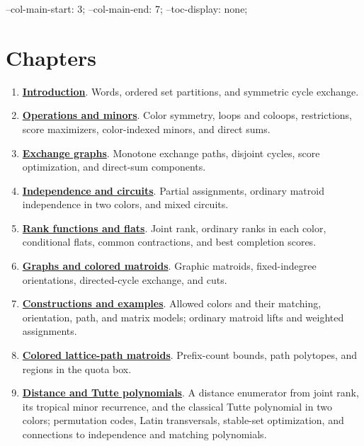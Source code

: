 
\begin{cssvars}
  --col-main-start: 3;
  --col-main-end: 7;
  --toc-display: none;
\end{cssvars}

\section[chapters]{Chapters}

\begin{enumerate}
\item \href{intro.htm}{\textbf{Introduction}}. Words, ordered set partitions,
and symmetric cycle exchange.

\item \href{operations.htm}{\textbf{Operations and minors}}. Color symmetry,
loops and coloops, restrictions, score maximizers, color-indexed minors, and
direct sums.

\item \href{exchange-graphs.htm}{\textbf{Exchange graphs}}. Monotone exchange
paths, disjoint cycles, score optimization, and direct-sum components.

\item \href{independence.htm}{\textbf{Independence and circuits}}. Partial
assignments, ordinary matroid independence in two colors, and mixed circuits.

\item \href{rank-flats.htm}{\textbf{Rank functions and flats}}. Joint rank,
ordinary ranks in each color, conditional flats, common contractions,
and best completion scores.

\item \href{graphic.htm}{\textbf{Graphs and colored matroids}}. Graphic
matroids, fixed-indegree orientations, directed-cycle exchange, and cuts.

\item \href{constructions.htm}{\textbf{Constructions and examples}}. Allowed
colors and their matching, orientation, path, and matrix models; ordinary
matroid lifts and weighted assignments.

\item \href{lattice-paths.htm}{\textbf{Colored lattice-path matroids}}.
Prefix-count bounds, path polytopes, and regions in the quota box.

\item \href{tutte.htm}{\textbf{Distance and Tutte polynomials}}. A distance
enumerator from joint rank, its tropical minor recurrence, and the classical
Tutte polynomial in two colors; permutation codes, Latin transversals,
stable-set optimization, and connections to independence and matching
polynomials.


\end{enumerate}
